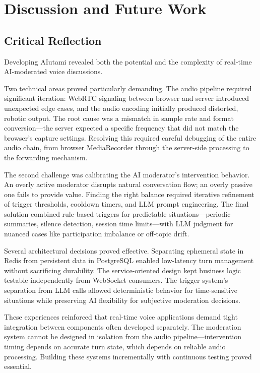 \chapter{Discussion and Future Work}

\section{Critical Reflection}

Developing AIutami revealed both the potential and the complexity of real-time AI-moderated voice discussions.

Two technical areas proved particularly demanding. The audio pipeline required significant iteration: WebRTC signaling between browser and server introduced unexpected edge cases, and the audio encoding initially produced distorted, robotic output. The root cause was a mismatch in sample rate and format conversion---the server expected a specific frequency that did not match the browser's capture settings. Resolving this required careful debugging of the entire audio chain, from browser MediaRecorder through the server-side processing to the forwarding mechanism.

The second challenge was calibrating the AI moderator's intervention behavior. An overly active moderator disrupts natural conversation flow; an overly passive one fails to provide value. Finding the right balance required iterative refinement of trigger thresholds, cooldown timers, and LLM prompt engineering. The final solution combined rule-based triggers for predictable situations---periodic summaries, silence detection, session time limits---with LLM judgment for nuanced cases like participation imbalance or off-topic drift.

Several architectural decisions proved effective. Separating ephemeral state in Redis from persistent data in PostgreSQL enabled low-latency turn management without sacrificing durability. The service-oriented design kept business logic testable independently from WebSocket consumers. The trigger system's separation from LLM calls allowed deterministic behavior for time-sensitive situations while preserving AI flexibility for subjective moderation decisions.

These experiences reinforced that real-time voice applications demand tight integration between components often developed separately. The moderation system cannot be designed in isolation from the audio pipeline---intervention timing depends on accurate turn state, which depends on reliable audio processing. Building these systems incrementally with continuous testing proved essential.


